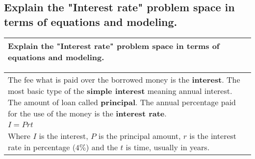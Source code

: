 \subsection{
        Explain the "Interest rate" problem space in terms of equations and
    modeling.}
\begin{small}
    \begin{tabularx}{1\textwidth}{
            p{}
        }
        \toprule
        Explain the "Interest rate" problem space in terms of equations and
        modeling.
        \\
        \bottomrule
    \end{tabularx}
\end{small}
\begin{small}
    \begin{tabularx}{1\textwidth}{
            p{}
        }
        \toprule
        The fee what is paid over the borrowed money is the \textbf{interest}.
        The most basic type of the \textbf{simple interest} meaning annual
        interest. The amount of loan called \textbf{principal}. The annual
        percentage paid for the use of the money is the \textbf{interest
        rate}.\\
        $ I = Prt $ \\
        Where $I$ is the interest, $P$ is the principal amount, $r$ is the
        interest rate in percentage ($4\%$) and the $t$ is time, usually in
        years.
        \\
        \bottomrule
    \end{tabularx}
\end{small}
